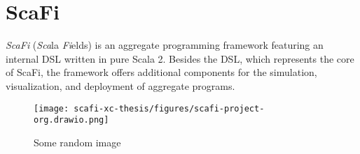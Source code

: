 \section{ScaFi}

\textit{ScaFi} (\textit{Sca}la \textit{Fi}elds) is an aggregate programming framework featuring an internal \ac{DSL} written in pure Scala 2.
%
Besides the \ac{DSL}, which represents the core of ScaFi, the framework offers additional components for the simulation, visualization, and deployment of aggregate programs.

\begin{figure}
    \centering
    \texttt{[image: scafi-xc-thesis/figures/scafi-project-org.drawio.png]}
    \caption{Some random image}
    \label{fig:random-image2}
\end{figure}

